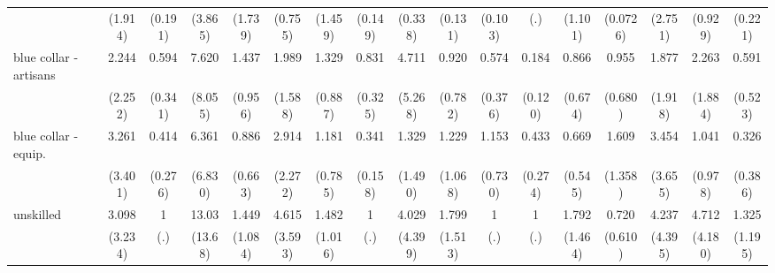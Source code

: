 {\begin{tabular}{l*{16}{c}}
                    &     (1.914)         &     (0.191)         &     (3.865)         &     (1.739)         &     (0.755)         &     (1.459)         &     (0.149)         &     (0.338)         &     (0.131)         &     (0.103)         &         (.)         &     (1.101)         &    (0.0726)         &     (2.751)         &     (0.929)         &     (0.221)         \\
[1em]
blue collar - artisans&       2.244         &       0.594         &       7.620         &       1.437         &       1.989         &       1.329         &       0.831         &       4.711         &       0.920         &       0.574         &       0.184\sym{**} &       0.866         &       0.955         &       1.877         &       2.263         &       0.591         \\
                    &     (2.252)         &     (0.341)         &     (8.055)         &     (0.956)         &     (1.588)         &     (0.887)         &     (0.325)         &     (5.268)         &     (0.782)         &     (0.376)         &     (0.120)         &     (0.674)         &     (0.680)         &     (1.918)         &     (1.884)         &     (0.523)         \\
[1em]
blue collar - equip.&       3.261         &       0.414         &       6.361         &       0.886         &       2.914         &       1.181         &       0.341\sym{*}  &       1.329         &       1.229         &       1.153         &       0.433         &       0.669         &       1.609         &       3.454         &       1.041         &       0.326         \\
                    &     (3.401)         &     (0.276)         &     (6.830)         &     (0.663)         &     (2.272)         &     (0.785)         &     (0.158)         &     (1.490)         &     (1.068)         &     (0.730)         &     (0.274)         &     (0.545)         &     (1.358)         &     (3.655)         &     (0.978)         &     (0.386)         \\
[1em]
unskilled           &       3.098         &           1         &       13.03\sym{*}  &       1.449         &       4.615\sym{*}  &       1.482         &           1         &       4.029         &       1.799         &           1         &           1         &       1.792         &       0.720         &       4.237         &       4.712         &       1.325         \\
                    &     (3.234)         &         (.)         &     (13.68)         &     (1.084)         &     (3.593)         &     (1.016)         &         (.)         &     (4.399)         &     (1.513)         &         (.)         &         (.)         &     (1.464)         &     (0.610)         &     (4.395)         &     (4.180)         &     (1.195)         \\

\end{tabular}}

